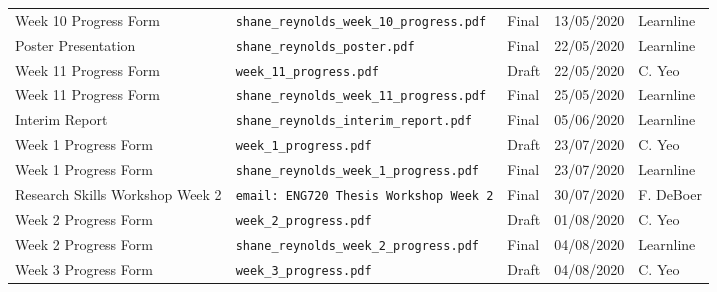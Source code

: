 \documentclass[10pt, landscape]{article}
\begin{document}
\begin{longtable}{p{7cm}p{10cm}p{1.5cm}p{2cm}p{2cm}}
	Week 10 Progress Form							& \verb|shane_reynolds_week_10_progress.pdf|								& Final				& 13/05/2020			& Learnline\\
	
	Poster Presentation								& \verb|shane_reynolds_poster.pdf|											& Final				& 22/05/2020			& Learnline\\
	
	Week 11 Progress Form							& \verb|week_11_progress.pdf|												& Draft				& 22/05/2020			& C. Yeo\\
						
	Week 11 Progress Form							& \verb|shane_reynolds_week_11_progress.pdf|								& Final				& 25/05/2020			& Learnline\\
	
	Interim Report									& \verb|shane_reynolds_interim_report.pdf|									& Final				& 05/06/2020			& Learnline\\
	
	Week 1 Progress Form							& \verb|week_1_progress.pdf|												& Draft				& 23/07/2020			& C. Yeo\\
	
	Week 1 Progress Form							& \verb|shane_reynolds_week_1_progress.pdf|									& Final				& 23/07/2020			& Learnline\\
	
	Research Skills Workshop Week 2					& \verb|email: ENG720 Thesis Workshop Week 2|								& Final				& 30/07/2020		 	& F. DeBoer\\
	
	Week 2 Progress Form							& \verb|week_2_progress.pdf|												& Draft				& 01/08/2020			& C. Yeo\\
	
	Week 2 Progress Form							& \verb|shane_reynolds_week_2_progress.pdf|									& Final				& 04/08/2020			& Learnline\\
	
	Week 3 Progress Form							& \verb|week_3_progress.pdf|												& Draft				& 04/08/2020			& C. Yeo\\
	
	\bottomrule
	\end{longtable}
\end{document}

